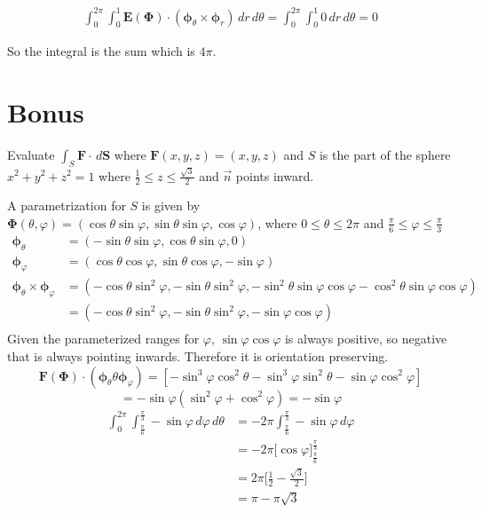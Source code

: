 \documentclass{article}
\begin{document}
\begin{enumerate}
                \begin{align*}
                    \int_0^{2\pi} \int_0^1 \boldsymbol E (\boldsymbol \Phi) \cdot (\boldsymbol \phi_\theta \times \boldsymbol \phi_r) \, dr \, d \theta = \int_0^{2\pi} \int_0^1  0 \, dr \, d \theta = 0
                \end{align*} 

                So the integral is the sum which is $4\pi$.
    \newpage
    \section*{Bonus}
    Evaluate $\displaystyle \int_S \boldsymbol F \cdot \, d\boldsymbol S$ where $\boldsymbol F (x,y,z) = (x,y,z)$ and $S$ is the part of the sphere $x^2+y^2+z^2 = 1$ where $\displaystyle \frac{1}{2} \leq z \leq \frac{\sqrt 3}{2}$ and $\vec{n}$ points inward.

                A parametrization for $S$ is given by $\boldsymbol \Phi (\theta, \varphi) = (\cos\theta \sin\varphi, \sin\theta \sin\varphi, \cos\varphi)$, where $0 \leq \theta \leq 2\pi$ and $\displaystyle \frac{\pi}{6} \leq \varphi \leq \frac{\pi}{3}$
                \begin{align*}
                \boldsymbol \phi_{\theta} &= (- \sin \theta \sin \varphi, \cos \theta \sin \varphi, 0)\\
                \boldsymbol \phi_{\varphi} &= (\cos \theta \cos \varphi, \sin \theta \cos \varphi, -\sin \varphi) \\
                \boldsymbol \phi_\theta \times \boldsymbol \phi_\varphi &= (-\cos\theta \sin^2\varphi, -\sin\theta \sin^2\varphi, - \sin^2\theta \sin\varphi \cos\varphi - \cos^2\theta \sin \varphi \cos \varphi) \\ 
                &= (-\cos\theta \sin^2\varphi, -\sin\theta \sin^2\varphi, - \sin\varphi \cos\varphi ) \\ 
                \end{align*}
                Given the parameterized ranges for $\varphi$, $\sin\varphi \cos\varphi$ is always positive, so negative that is always pointing inwards. Therefore it is orientation preserving.
                \[\boldsymbol F (\boldsymbol \Phi) \cdot ( \boldsymbol \phi_\theta \theta \boldsymbol \phi_\varphi) = [-\sin^3 \varphi \cos^2 \theta - \sin^3 \varphi \sin^2 \theta - \sin \varphi \cos^2 \varphi]\]
                \[= -\sin \varphi ( \sin^2 \varphi + \cos^2 \varphi) = - \sin \varphi\]
                \begin{align*}
                    \int_0^{2\pi} \int_{\frac{\pi}{6}}^{\frac{\pi}{3}} - \sin \varphi \, d \varphi \, d \theta &=  -2 \pi \int_{\frac{\pi}{6}}^{\frac{\pi}{3}} - \sin \varphi \, d \varphi \\
                    &=  -2 \pi \big[\cos \varphi\big]_{\frac{\pi}{6}}^{\frac{\pi}{3}} \\
                    &= 2\pi \bigg[\frac{1}{2} - \frac{\sqrt 3}{2}\bigg] \\
                    &= \pi - \pi\sqrt 3
                \end{align*}
\end{enumerate}
\end{document}
